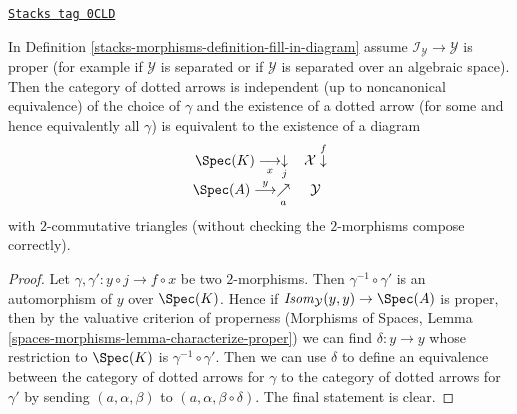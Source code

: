 \begin{lemma}
\label{stacks-morphisms-lemma-cat-dotted-arrows-independent}
\href{https://stacks.math.columbia.edu/tag/0CLD}{\texttt{Stacks tag 0CLD}}

In Definition \ref{stacks-morphisms-definition-fill-in-diagram}
assume $\mathcal{I}_\mathcal{Y} \to \mathcal{Y}$ is proper
(for example if $\mathcal{Y}$ is separated or if $\mathcal{Y}$
is separated over an algebraic space). Then the category of dotted arrows
is independent (up to noncanonical equivalence) of the choice of $\gamma$
and the existence of a dotted arrow
(for some and hence equivalently all $\gamma$)
is equivalent to the existence of a diagram
$$
\begin{array}{cc}\Spec(K) \underset{x}{\longrightarrow}\underset{j}{\downarrow} & \mathcal{X} \overset{f}{\downarrow} \\ \Spec(A) \overset{y}{\longrightarrow}\underset{a}{\nearrow} & \mathcal{Y}\end{array}
$$
with $2$-commutative triangles
(without checking the $2$-morphisms compose correctly).
\end{lemma}

\begin{proof}
Let $\gamma, \gamma' : y \circ j \longrightarrow f \circ x$
be two $2$-morphisms. Then $\gamma^{-1} \circ \gamma'$
is an automorphism of $y$ over $\Spec(K)$.
Hence if $\mathit{Isom}_\mathcal{Y}(y, y) \to \Spec(A)$
is proper, then by the valuative criterion of properness
(Morphisms of Spaces, Lemma \ref{spaces-morphisms-lemma-characterize-proper})
we can find $\delta : y \to y$ whose restriction to
$\Spec(K)$ is $\gamma^{-1} \circ \gamma'$.
Then we can use $\delta$ to define an equivalence
between the category of dotted arrows for $\gamma$
to the category of dotted arrows for $\gamma'$ by
sending $(a, \alpha, \beta)$ to $(a, \alpha, \beta \circ \delta)$.
The final statement is clear.
\end{proof}

